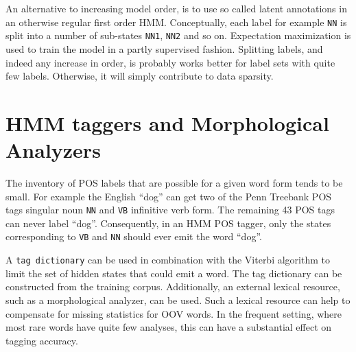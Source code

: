 An alternative to increasing model order, is to use so called latent
annotations \citep{Huang2009} in an otherwise regular first order
HMM. Conceptually, each label for example {\tt NN} is split into a
number of sub-states {\tt NN1}, {\tt NN2} and so on. Expectation
maximization is used to train the model in a partly supervised
fashion. Splitting labels, and indeed any increase in order, is
probably works better for label sets with quite few labels. Otherwise,
it will simply contribute to data sparsity.


\section{HMM taggers and Morphological Analyzers}
\label{sec:hmm-label-dict}

The inventory of POS labels that are possible for a given word form
tends to be small. For example the English ``dog'' can get two of the
Penn Treebank POS tags singular noun {\tt NN} and {\tt VB} infinitive
verb form. The remaining 43 POS tags can never label
``dog''. Consequently, in an HMM POS tagger, only the states
corresponding to {\tt VB} and {\tt NN} should ever emit the word
``dog''.

A {\tt tag dictionary} \citep{Brants2000} can be used in combination
with the Viterbi algorithm to limit the set of hidden states that
could emit a word. The tag dictionary can be constructed from the
training corpus. Additionally, an external lexical resource, such as a
morphological analyzer, can be used. Such a lexical resource can help
to compensate for missing statistics for OOV words. In the frequent
setting, where most rare words have quite few analyses, this can have
a substantial effect on tagging accuracy.

